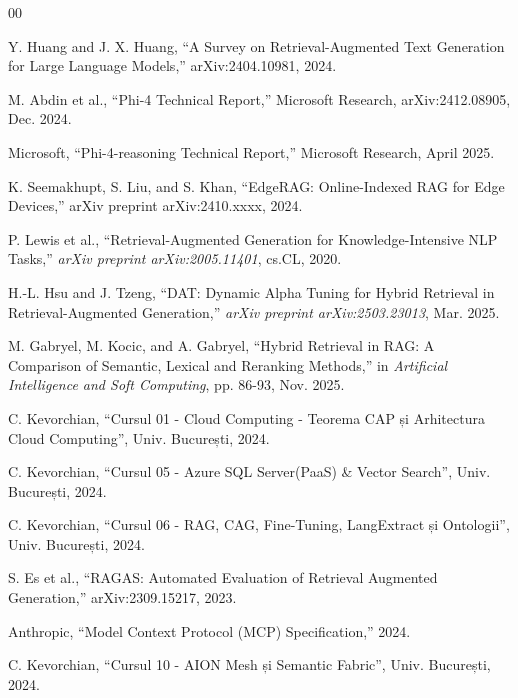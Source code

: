 \documentclass[conference]{IEEEtran}
\begin{document}
\begin{thebibliography}{00}

 Y. Huang and J. X. Huang, ``A Survey on Retrieval-Augmented Text Generation for Large Language Models,'' arXiv:2404.10981, 2024.

 M. Abdin et al., ``Phi-4 Technical Report,'' Microsoft Research, arXiv:2412.08905, Dec. 2024.

 Microsoft, ``Phi-4-reasoning Technical Report,'' Microsoft Research, April 2025.

 K. Seemakhupt, S. Liu, and S. Khan, ``EdgeRAG: Online-Indexed RAG for Edge Devices,'' arXiv preprint arXiv:2410.xxxx, 2024.

P. Lewis et al., ``Retrieval-Augmented Generation for Knowledge-Intensive NLP Tasks,''
\textit{arXiv preprint arXiv:2005.11401}, cs.CL, 2020.

 H.-L. Hsu and J. Tzeng, ``DAT: Dynamic Alpha Tuning for Hybrid Retrieval in Retrieval-Augmented Generation,'' \textit{arXiv preprint arXiv:2503.23013}, Mar. 2025.

 M. Gabryel, M. Kocic, and A. Gabryel, ``Hybrid Retrieval in RAG: A Comparison of Semantic, Lexical and Reranking Methods,'' in \textit{Artificial Intelligence and Soft Computing}, pp. 86-93, Nov. 2025.

 C. Kevorchian, ``Cursul 01 - Cloud Computing - Teorema CAP și Arhitectura Cloud Computing'', Univ. București, 2024.

 C. Kevorchian, ``Cursul 05 - Azure SQL Server(PaaS) \& Vector Search'', Univ. București, 2024.

 C. Kevorchian, ``Cursul 06 - RAG, CAG, Fine-Tuning, LangExtract și Ontologii'', Univ. București, 2024.

 S. Es et al., ``RAGAS: Automated Evaluation of Retrieval Augmented Generation,'' arXiv:2309.15217, 2023.

 Anthropic, ``Model Context Protocol (MCP) Specification,'' 2024.

 C. Kevorchian, ``Cursul 10 - AION Mesh și Semantic Fabric'', Univ. București, 2024.


\end{thebibliography}
\end{document}
